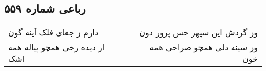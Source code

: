 \begin{center}
\section*{رباعی شماره ۵۵۹}
\label{sec:sh559}
\begin{longtable}{l p{0.5cm} r}
دارم ز جفای فلک آینه گون
&&
وز گردش این سپهر خس پرور دون
\\
از دیده رخی همچو پیاله همه اشک
&&
وز سینه دلی همچو صراحی همه خون
\\
\end{longtable}
\end{center}
